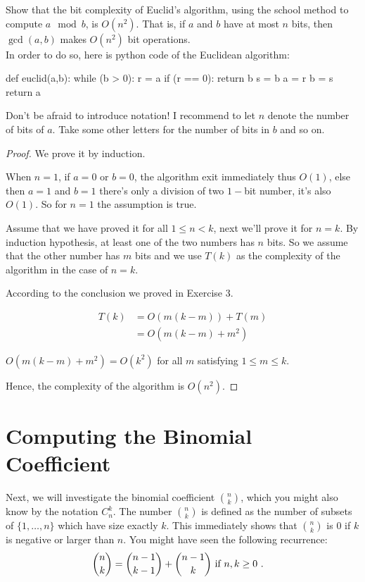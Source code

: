 \documentclass[11pt,a4paper,oneside]{article}
\begin{document}
\begin{problem}{2}
\statement
Show that the bit complexity of Euclid's algorithm, using the school method
to compute $a \mod b$, is $O(n^2)$. That is,
if $a$ and $b$ have at most $n$ bits, then $\gcd(a,b)$ makes $O(n^2)$ bit operations.\\

In order to do so, here is python code of the Euclidean algorithm:
\begin{python}
def euclid(a,b):
	while (b > 0):
		r = a %
		if (r == 0):
			return b
		s = b %
		a = r
		b = s
  	return a
\end{python}
Don't be afraid to introduce notation! I recommend to let $n$ denote the number of bits of $a$.
Take some other letters for the number of bits in $b$ and so on.
\solution
\begin{proof}
	
We prove it by induction.

When \(n = 1\), if $a = 0$ or $b = 0$, the algorithm exit immediately thus $O(1)$, else then $a = 1$ and $b = 1$ there's only a division of two $1-$bit number, it's also $O(1)$. So for $n = 1$ the assumption is true.

Assume that we have proved it for all \(1 \leq n < k \), next we'll prove it for \( n=k\). By induction hypothesis, at least one of the two numbers has \(n \) bits. So we assume that the other number has \(m \) bits and we use \(T(k)\) as the complexity of the algorithm in the case of \(n=k\).

According to the conclusion we proved in Exercise 3.

\[
	\begin{split}
		T(k) &= O(m(k - m)) + T(m) \\
		&= O(m(k-m) + m^2)
	\end{split}
\]

\( O(m(k - m) + m^2) = O(k^2)\) for all \(m\) satisfying \(1 \leq m \leq k\).

Hence, the complexity of the algorithm is \(O(n^2)\).

\end{proof}
\end{problem}

\section*{Computing the Binomial Coefficient}

    Next, we will investigate the binomial coefficient ${n \choose k}$, which 
    you might also know by the notation $C^k_n$. The number ${n \choose k}$ is defined
    as the number of subsets of $\{1,\dots,n\}$ which have size exactly $k$. 
    This immediately shows that ${n \choose k}$ is $0$ if $k$ is negative or larger than $n$.
    You might have seen the following recurrence:
    \begin{align*}
     {n \choose k} & = {n-1 \choose k-1} + {n-1 \choose k} \textnormal{ if } n,k \geq 0 \ .
    \end{align*}
\end{document}
